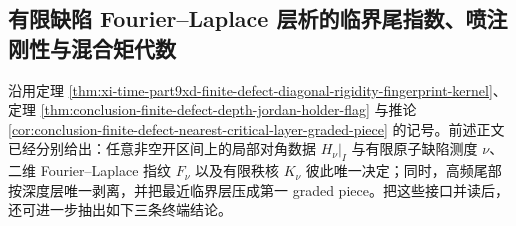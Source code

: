 \subsection{有限缺陷 Fourier--Laplace 层析的临界尾指数、喷注刚性与混合矩代数}\label{subsec:conclusion-finite-defect-fourier-laplace-jet-tomography}
沿用定理 \ref{thm:xi-time-part9xd-finite-defect-diagonal-rigidity-fingerprint-kernel}、定理 \ref{thm:conclusion-finite-defect-depth-jordan-holder-flag} 与推论 \ref{cor:conclusion-finite-defect-nearest-critical-layer-graded-piece} 的记号。前述正文已经分别给出：任意非空开区间上的局部对角数据 \(\left.H_\nu\right|_I\) 与有限原子缺陷测度 \(\nu\)、二维 Fourier--Laplace 指纹 \(F_\nu\) 以及有限秩核 \(K_\nu\) 彼此唯一决定；同时，高频尾部按深度层唯一剥离，并把最近临界层压成第一 graded piece。把这些接口并读后，还可进一步抽出如下三条终端结论。

